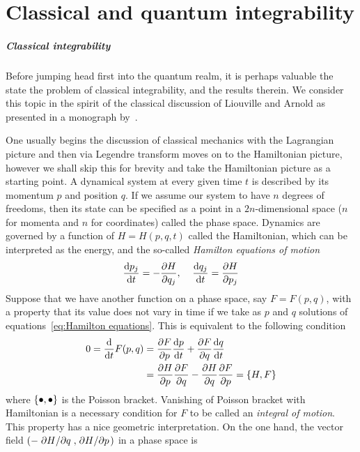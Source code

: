 \chapter{Classical and quantum integrability\label{app:int}}
\thispagestyle{chapterBeginStyle}

\paragraph{Classical integrability}Before jumping head first into the quantum realm, it is perhaps valuable the state
the problem of classical integrability, and the results therein.
We consider this topic in the spirit of the classical discussion
of Liouville and Arnold as presented in a monograph by~\textcite{Gutzwiller1991}.

One usually begins the discussion of classical mechanics with the Lagrangian picture and then
via Legendre transform moves on to the Hamiltonian picture, however we shall skip this
for brevity and take the Hamiltonian picture as a starting point.
A dynamical system at every given time \(t\) is described by its momentum \(p\) and
position \(q\). If we assume our system to have \(n\) degrees of freedoms, then
its state can be specified as a point in a \(2n\)-dimensional space (\(n\) for momenta and
\(n\) for coordinates) called the phase space. Dynamics are governed by a function
of \(H = H(p,q,t)\) called the Hamiltonian, which can be interpreted as the energy,
and the so-called \textit{Hamilton equations of motion}
\begin{equation}
    \dv{p_j}{t} = -\pdv{H}{q_j},\; \; \; \; \dv{q_j}{t} = \pdv{H}{p_j}
    \label{eq:Hamilton equations}
\end{equation} 
Suppose that we have another function on a phase space, say \(F=F(p,q)\), with
a property that its value does not vary in time if we take as \(p\) and \(q\) solutions
of equations~\eqref{eq:Hamilton equations}. This is equivalent to the following condition
\begin{align}
    0 = \dv{}{t}F(p,q) &= \pdv{F}{p} \dv{p}{t} + \pdv{F}{q}\dv{q}{t} \nonumber{}\\
    &= \pdv{H}{p}\pdv{F}{q} - \pdv{H}{q}\pdv{F}{p} = \poissonbracket{H}{F}
\end{align}
where \(\poissonbracket{\bullet }{\bullet }\) is the Poisson bracket.
Vanishing of Poisson bracket with Hamiltonian is a necessary condition for \(F\)
to be called an \textit{integral of motion}. This property has a nice geometric interpretation.
On the one hand, the vector field \(\left(-\pdv*{H}{q},\pdv*{H}{p}\right)\) in a phase space is
